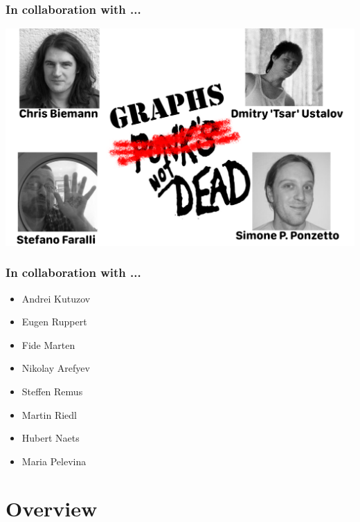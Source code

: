 
\begin{frame}
  \frametitle{In collaboration with ... }

 \includegraphics[width=.95\textwidth]{figures/collaborators}	
\end{frame}



\begin{frame}
  \frametitle{In collaboration with ... }
  { \Large \bf
  \begin{itemize}
  	\item Andrei Kutuzov
  	\item Eugen Ruppert
  	\item Fide Marten
  	\item Nikolay Arefyev
  	\item Steffen Remus
  	\item Martin Riedl
  	\item Hubert Naets
   	\item Maria Pelevina

  
  \end{itemize}	
  }
\end{frame}


\section{Overview}

